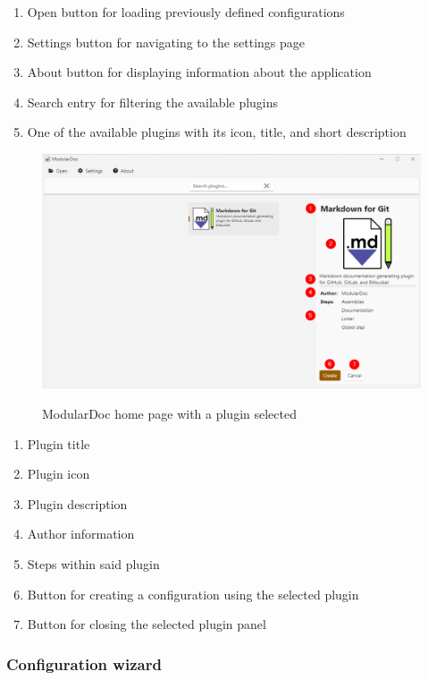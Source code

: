 \begin{enumerate}
    \item Open button for loading previously defined configurations
    \item Settings button for navigating to the settings page
    \item About button for displaying information about the application
    \item Search entry for filtering the available plugins
    \item One of the available plugins with its icon, title, and short description
\end{enumerate}

\begin{figure}[H]
    \includegraphics[width=\linewidth]{img/modularDocPluginSelected.png}
    \label{fig:modularDocPluginSelected}
    \caption{ModularDoc home page with a plugin selected}
\end{figure}

\begin{enumerate}
    \item Plugin title
    \item Plugin icon
    \item Plugin description
    \item Author information
    \item Steps within said plugin
    \item Button for creating a configuration using the selected plugin
    \item Button for closing the selected plugin panel
\end{enumerate}

\pagebreak
\subsubsection{Configuration wizard}

